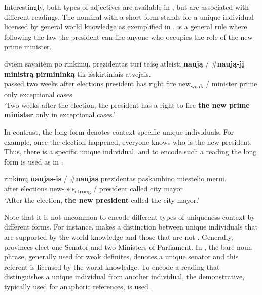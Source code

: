 \documentclass[output=paper,
modfonts
]{langscibook}
\begin{document}
Interestingly, both types of adjectives are available in , but are associated with different readings. The nominal with a short form stands for a unique individual licensed by general world knowledge as exemplified in .  is a general rule where following the law the president can fire anyone who occupies the role of the new prime minister.

\begin{exe}
	\ex \label{ex:sereikaite:46}
	 {dviem} {savaitėm} {po} {rinkimų}, {prezidentas} {turi} {teisę} {atleisti} \textbf{naują} \textnormal{/} \textnormal{\#}\textbf{naują-jį} \textbf{{ministrą}} \textbf{{pirmininką}} {tik} {išskirtiniais} {atvejais}.\\
	passed two weeks after elections president has right fire {new\textsubscript{weak}} /  {minister} {prime} only exceptional cases\\
	\trans `Two weeks after the election, the president has a right to fire \textbf{the new prime minister} only in exceptional cases.' 
\end{exe}

In contrast, the long form denotes context-specific unique individuals. For example, once the election happened, everyone knows who is the new president. Thus, there is a specific unique individual, and to encode such a reading the long form is used as in .
 
\begin{exe} 
	\ex \label{ex:sereikaite:47}
	 {rinkimų} \textbf{naujas-is} \textnormal{/} \textnormal{\#}\textbf{naujas} {prezidentas} {paskambino} {miestelio} {merui}.\\
	after elections {new-\textsc{def}\textsubscript{strong}} /  president called city mayor\\
	\trans `After the election, \textbf{the new president} called the city mayor.' 
\end{exe} 

Note that it is not uncommon to encode different types of uniqueness context by different forms. For instance,  makes a distinction between unique individuals that are supported by the world knowledge and those that are not \citep{Jenks2015}. Generally,  provinces elect one Senator and two Ministers of Parliament. In , the bare noun phrase, generally used for weak definites, denotes a unique senator and this referent is licensed by the world knowledge. To encode a reading that distinguishes a unique individual from another individual, the demonstrative, typically used for anaphoric references, is used .
\end{document}
